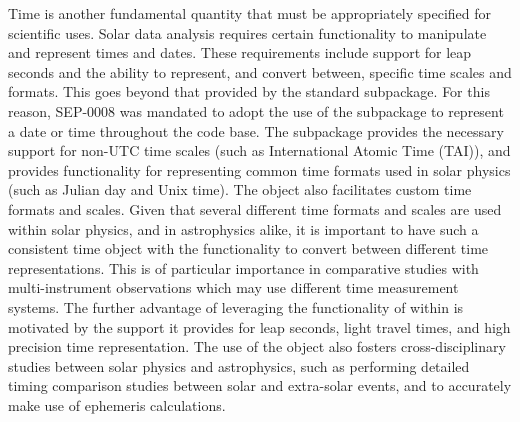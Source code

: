 Time is another fundamental quantity that must be appropriately specified for scientific uses.
Solar data analysis requires certain functionality to manipulate and represent times and dates.
These requirements include support for leap seconds and the ability to represent, and convert between, specific time scales and formats.
This goes beyond that provided by the standard \python {} subpackage.
For this reason, SEP-0008 \citep{sep-0008} was mandated to adopt the use of the  subpackage to represent a date or time throughout the \sunpypkg code base.
The  subpackage provides the necessary support for non-UTC time scales (such as International Atomic Time (TAI)), and provides functionality for representing common time formats used in solar physics (such as Julian day and Unix time). The  object also facilitates custom time formats and scales.
Given that several different time formats and scales are used within solar physics, and in astrophysics alike, it is important to have such a consistent time object with the functionality to convert between different time representations.
This is of particular importance in comparative studies with multi-instrument observations which may use different time measurement systems.
The further advantage of leveraging the functionality of  within \sunpypkg is motivated by the support it provides for leap seconds, light travel times, and high precision time representation.
The use of the  object also fosters cross-disciplinary studies between solar physics and astrophysics, such as performing detailed timing comparison studies between solar and extra-solar events, and to accurately make use of ephemeris calculations.

